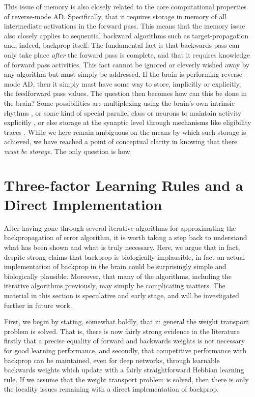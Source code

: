 This issue of memory is also closely related to the core computational properties of reverse-mode AD. Specifically, that it requires storage in memory of all intermediate activations in the forward pass. This means that the memory issue also closely applies to sequential backward algorithms such as target-propagation and, indeed, backprop itself. The fundamental fact is that backwards pass can only take place \emph{after} the forward pass is complete, and that it requires knowledge of forward pass activities. This fact cannot be ignored or cleverly wished away by any algorithm but must simply be addressed. If the brain is performing reverse-mode AD, then it simply must have some way to store, implicitly or explicitly, the feedforward pass values. The question then becomes how can this be done in the brain? Some possibilities are multiplexing using the brain's own intrinsic rhythms \citep{buzsaki2006rhythms}, or some kind of special parallel class or neurons to maintain activity explicitly \citep{o1999biologically}, or else storage at the synaptic level through mechanisms like eligibility traces \citep{bellec2020solution}. While we here remain ambiguous on the means by which such storage is achieved, we have reached a point of conceptual clarity in knowing that there \emph{must be storage}. The only question is how.

\section{Three-factor Learning Rules and a Direct Implementation}

After having gone through several iterative algorithms for approximating the backpropagation of error algorithm, it is worth taking a step back to understand what has been shown and what is truly necessary. Here, we argue that in fact, despite strong claims that backprop is biologically implausible, in fact an actual implementation of backprop in the brain could be surprisingly simple and biologically plausible. Moreover, that many of the algorithms, including the iterative algorithms previously, may simply be complicating matters. The material in this section is speculative and early stage, and will be investigated further in future work.

First, we begin by stating, somewhat boldly, that in general the weight transport problem is solved. That is, there is now fairly strong evidence in the literature \citep{lillicrap2016random,amit2019deep,akrout2019deep,millidge2020relaxing} firstly that a precise equality of forward and backwards weights is not necessary for good learning performance, and secondly, that competitive performance with backprop can be maintained, even for deep networks, through learnable backwards weights which update with a fairly straightforward Hebbian learning rule. If we assume that the weight transport problem is solved, then there is only the locality issues remaining with a direct implementation of backprop.

